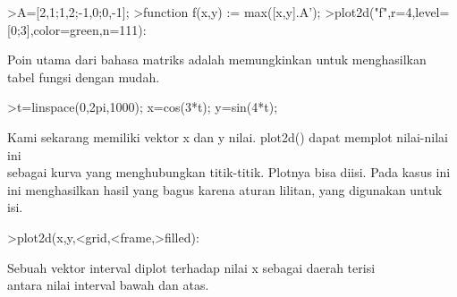 \documentclass[a4paper,10pt]{article}
\begin{document}
\begin{eulernotebook}
\begin{eulercomment}
\begin{eulercomment}
\begin{eulercomment}
\begin{eulercomment}
\begin{eulercomment}
\begin{eulercomment}
\begin{eulerprompt}
>A=[2,1;1,2;-1,0;0,-1];
>function f(x,y) := max([x,y].A');
>plot2d("f",r=4,level=[0;3],color=green,n=111):
\end{eulerprompt}
\begin{eulercomment}
Poin utama dari bahasa matriks adalah memungkinkan untuk menghasilkan
tabel fungsi dengan mudah.
\end{eulercomment}
\begin{eulerprompt}
>t=linspace(0,2pi,1000); x=cos(3*t); y=sin(4*t);
\end{eulerprompt}
\begin{eulercomment}
Kami sekarang memiliki vektor x dan y nilai. plot2d() dapat memplot
nilai-nilai ini\\
sebagai kurva yang menghubungkan titik-titik. Plotnya bisa diisi. Pada
kasus ini\\
ini menghasilkan hasil yang bagus karena aturan lilitan, yang
digunakan untuk\\
isi.
\end{eulercomment}
\begin{eulerprompt}
>plot2d(x,y,<grid,<frame,>filled):
\end{eulerprompt}
\begin{eulercomment}
Sebuah vektor interval diplot terhadap nilai x sebagai daerah terisi\\
antara nilai interval bawah dan atas.


\end{eulercomment}
\end{eulercomment}
\end{eulercomment}
\end{eulercomment}
\end{eulercomment}
\end{eulercomment}
\end{eulercomment}
\end{eulernotebook}
\end{document}
